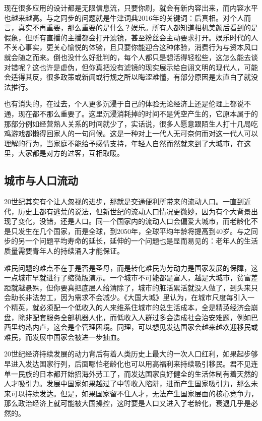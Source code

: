 \documentclass[
]{book}
\begin{document}
现在很多应用的设计都是无限信息流，只要你刷，就会有新内容出来，而内容水平也越来越高。与之同步的问题就是牛津词典2016年的关键词：后真相。对个人而言，真实不再重要，那么重要的是什么？娱乐。所有人都知道相机美颜后看到的是假象，但所有直播的主播都会打开滤镜，甚至粉丝会主动要求打开。娱乐时代的人不关心事实，更关心愉悦的体验，且只要你能迎合这种体验，消费行为与资本风口就会随之而来。倒也没什么好批判的，每个人都只是想活得轻松些，这怎么能去谈对错呢？这也许是虚伪，但你真把没有滤镜的现实展示给自诩文明的现代人，可能会适得其反，很多政策或新闻或行规之所以晦涩难懂，有部分原因是太直白了就没法推行。

也有消失的，在过去，个人更多沉浸于自己的体验无论经济上还是伦理上都说不通，现在都不那么重要了。这里沉浸消耗掉的时间不是凭空产生的，它原本属于的那部分例如经营熟人关系的时间就少了，实话说，很多人愿意跟陌生人打十几局吃鸡游戏都懒得回家人的一句问候。这是一种对上一代人无可奈何而对这一代人可以理解的行为，当家庭不能给予感情支持，年轻人自然而然就来到了大城市，在这里，大家都是对方的过客，互相取暖。

\hypertarget{ux57ceux5e02ux4e0eux4ebaux53e3ux6d41ux52a8}{%
\subsection{城市与人口流动}\label{ux57ceux5e02ux4e0eux4ebaux53e3ux6d41ux52a8}}

20世纪其实有个让人忽视的进步，那就是交通便利所带来的流动人口。一直到近代，历史上都有逃荒的说法，但新世纪的流动人口情况更微妙，因为有个大背景出现了变化，没错，还是人口。同一个国家内的流动人口会偏爱大城市，而老龄化不是只发生在几个国家，而是全球，到2050年，全球平均年龄将提高到40岁。与之同步的另一个问题平均寿命的延长，延伸的一个问题也是显而易见的：老年人的生活质量需要青年人的持续涌入才能保证。

难民问题的难点不在于是否是圣母，而是转化难民为劳动力是国家发展的保障，这一点城市早就进行了缩微版演示。一个城市不可能都是富人，越是大城市，贫富差距就越悬殊，但你要真把底层人给清除了，城市的脏活累活就没人做了，到头来只会助长非法劳工，因为需求不会减少。《大国大城》里认为，在城市尺度每引入一个精英，就必须配一个低收入的人来维系住城市的总生活成本，全是精英经济会崩盘，除非配套服务全部机器人化，而低收入人群过多会造成社会治安难题，例如巴西里约热内卢，这会是个管理困境。同理，可以想见发达国家会越来越欢迎移民或难民，而发展中国家会被进一步抽血。

20世纪经济持续发展的动力背后有着人类历史上最大的一次人口红利，如果起步够早进入发达国家行列，后面哪怕老龄化也可以用高福利来持续吸引移民。君不见连单一民族的日本都开始招海外劳工了，而发达国家良好健全的生活体制有着天然的人才吸引力。发展中国家如果越过了中等收入陷阱，进而产生国家吸引力，那么未来可以持续发达。但是，如果国家留不住人才，无法产生国家层面的核心竞争力，那么政治经济上就可能被大国操控，这时要是人口又进入了老龄化，衰退几乎是必然的。
\end{document}
